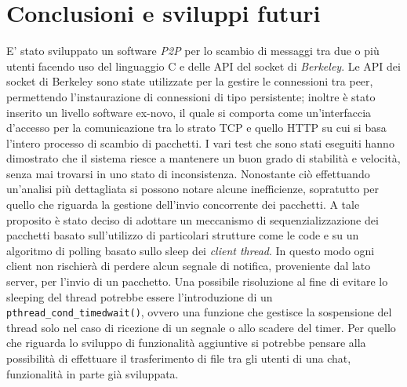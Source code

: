 \chapter{Conclusioni e sviluppi futuri}\label{conclusioni}
E' stato sviluppato un software \textit{P2P} per lo scambio di messaggi tra due o più utenti facendo uso del linguaggio C e delle API del socket di \textit{Berkeley}. Le API dei socket di Berkeley sono state utilizzate per la gestire le connessioni tra peer, permettendo l'instaurazione di connessioni di tipo persistente; inoltre è stato inserito un livello software ex-novo, il quale si comporta come un'interfaccia d'accesso per la comunicazione tra lo strato TCP e quello HTTP su cui si basa l'intero processo di scambio di pacchetti.
I vari test che sono stati eseguiti hanno dimostrato che il sistema riesce a mantenere un buon grado di stabilità e velocità, senza mai trovarsi in uno stato di inconsistenza. Nonostante ciò effettuando un'analisi più dettagliata si possono notare alcune inefficienze, sopratutto per quello che riguarda la gestione dell'invio concorrente dei pacchetti. A tale proposito è stato deciso di adottare un meccanismo di sequenzializzazione dei pacchetti basato sull'utilizzo di particolari strutture come le code e su un algoritmo di polling basato sullo sleep dei \textit{client thread}.
In questo modo ogni client non rischierà di perdere alcun segnale di notifica, proveniente dal lato server, per l'invio di un pacchetto. Una possibile risoluzione al fine di evitare lo sleeping del thread potrebbe essere l'introduzione di un \texttt{pthread\_cond\_timedwait()}, ovvero una funzione che gestisce la sospensione del thread solo nel caso di ricezione di un segnale o allo scadere del timer. Per quello che riguarda lo sviluppo di funzionalità aggiuntive si potrebbe pensare alla possibilità di effettuare il trasferimento di file tra gli utenti di una chat, funzionalità in parte già sviluppata.